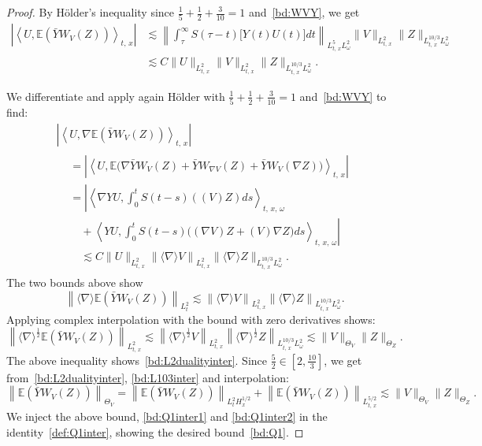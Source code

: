 \documentclass[10pt]{amsart}
\theoremstyle{definition}\newtheorem{defi}[theo]{Definition}\newtheorem{rema}[theo]{Remark}\newtheorem{exam}[theo]{Example}\newtheorem{exem}[theo]{Example}\newtheorem{nota}[theo]{Notation}
\newcommand{\E}{\mathbb{E}}
\begin{document}
\begin{proof}
By H\"older's inequality since $\tfrac 15+\tfrac 12+\tfrac{3}{10}=1$ and~\eqref{bd:WVY}, we get
\begin{align*}
\left|\left\langle U, \E\left(\bar Y W_V(Z)\right)\right\rangle_{t,\,x}\right| &\lesssim \left\|\int_{\tau}^\infty S(\tau - t)\big[Y(t)U(t)\big]dt\right\|_{L^5_{t,\,x} L^2_\omega}\|V\|_{L^2_{t,\,x}} \|Z\|_{L^{10/3}_{t,\,x} L^2_\omega}\\
&\lesssim C\|U\|_{L^2_{t,\,x}}\|V\|_{L^2_{t,\,x}} \|Z\|_{L^{10/3}_{t,\,x} L^2_\omega}.
\end{align*}

We differentiate and apply again H\"older with $\tfrac 15+\tfrac 12+\tfrac{3}{10}=1$ and~\eqref{bd:WVY} to find:
\begin{multline*}
\left|\left\langle U, \nabla \E\left(\bar Y W_V(Z)\right)\right\rangle_{t,\,x}\right| \\
\begin{aligned}
&=\left| \left\langle U, \E\big(\nabla \bar Y W_V(Z)+\bar Y W_{\nabla V}(Z)+\bar Y W_{V}(\nabla Z)\big)\right\rangle_{t,\,x}\right| \\
&=\left| \left\langle \nabla YU,\int_0^t S(t-s)((V)Z)ds\right\rangle_{t,\,x,\,\omega}\right.\\
&\left.\quad+\left\langle YU,\int_0^t S(t-s)\big((\nabla V)Z+(V)\nabla Z\big)ds\right\rangle_{t,\,x,\,\omega}\right|\\
&\quad\lesssim C\|U\|_{L^2_{t,\,x}}\left\| \langle \nabla \rangle V\right\|_{L^2_{t,\,x}} \|\langle \nabla \rangle Z\|_{L^{10/3}_{t,\,x} L^2_\omega}.
\end{aligned}
\end{multline*}
The two bounds above show
\[
\left\| \langle \nabla \rangle \E\left(\bar Y W_V(Z)\right)\right\|_{L^2_t}\lesssim \left\| \langle \nabla \rangle V\right\|_{L^2_{t,\,x}} \left\|\langle \nabla \rangle Z\right\|_{L^{10/3}_{t,\,x} L^2_\omega}.
\]
Applying complex interpolation with the bound with zero derivatives shows:
\[
\left\| \langle \nabla \rangle^{\frac 12}\E\left(\bar Y W_V(Z)\right)\right\|_{L^2_{t,\,x}}\lesssim \left\| \langle \nabla \rangle^{\frac 12}V\right\|_{L^2_{t,\,x}} \left\| \langle \nabla \rangle^{\frac 12} Z\right\|_{L^{10/3}_{t,\,x} L^2_\omega}\lesssim \| V \|_{\Theta_V}\| Z \|_{\Theta_Z}.
\]
The above inequality shows~\eqref{bd:L2dualityinter}. Since $\tfrac52 \in [2,\tfrac{10}{3}]$, we get from~\eqref{bd:L2dualityinter}, \eqref{bd:L103inter} and interpolation:
\[
\left\| \E\left(\bar Y W_V(Z)\right)\right\|_{\Theta_V}=
\left\| \E\left(\bar Y W_V(Z)\right)\right\|_{L^2_{t}H^{1/2}_x}+\left\| \E\left(\bar Y W_V(Z)\right)\right\|_{L^{5/2}_{t,\,x}} \lesssim \|V\|_{\Theta_V} \|Z\|_{\Theta_Z}.
\]
We inject the above bound, \eqref{bd:Q1inter1} and \eqref{bd:Q1inter2} in the identity~\eqref{def:Q1inter}, showing the desired bound~\eqref{bd:Q1}.
\end{proof}
\end{document}
